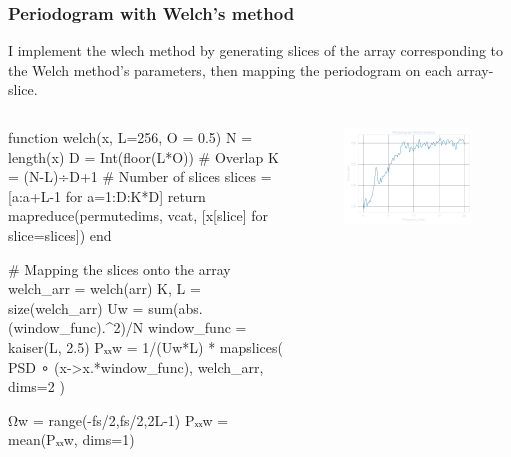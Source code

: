 \documentclass[compress]{beamer}
\begin{document}
\begin{frame}[fragile] %
    \frametitle{Periodogram with Welch's method}
    I implement the wlech method by generating slices of the array
    corresponding to the Welch method's parameters, then mapping the periodogram
    on each array-slice.
    \begin{columns}
        \begin{column}{0.5\textwidth}
            \begin{jllisting}[gobble=16]
                function welch(x, L=256, O = 0.5)
                    N = length(x)
                    D = Int(floor(L*O)) # Overlap 
                    K = (N-L)÷D+1  # Number of slices
                    slices = [a:a+L-1 for a=1:D:K*D]
                    return mapreduce(permutedims, vcat, [x[slice] for slice=slices])
                end

                # Mapping the slices onto the array
                welch_arr = welch(arr)
                K, L = size(welch_arr)
                Uw = sum(abs.(window_func).^2)/N
                window_func = kaiser(L, 2.5)
                Pₓₓw = 1/(Uw*L) * mapslices(
                    PSD ∘ (x->x.*window_func), 
                    welch_arr, 
                    dims=2
                )

                Ωw = range(-fs/2,fs/2,2L-1)
                Pₓₓw = mean(Pₓₓw, dims=1)
            \end{jllisting}
        \end{column}
        \begin{column}{0.5\textwidth}
            \begin{figure}
                \includegraphics[width=\columnwidth]{"../1c.pdf"}
            \end{figure}
        \end{column}
    \end{columns}
\end{frame}
\end{document}

